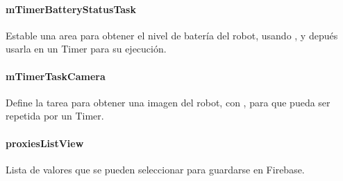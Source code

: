 \paragraph{mTimerBatteryStatusTask}
\label{\detokenize{dev_docs:mtimerbatterystatustask}}

\begin{fulllineitems}
\label{\detokenize{dev_docs:com.lar.cloudnao.RemoteControllerActivity.mTimerBatteryStatusTask}}
Estable una area para obtener el nivel de batería del robot, usando , y depués usarla en un Timer para su ejecución.

\end{fulllineitems}



\paragraph{mTimerTaskCamera}
\label{\detokenize{dev_docs:mtimertaskcamera}}

\begin{fulllineitems}
\label{\detokenize{dev_docs:com.lar.cloudnao.RemoteControllerActivity.mTimerTaskCamera}}
Define la tarea para obtener una imagen del robot, con , para que pueda ser repetida por un Timer.

\end{fulllineitems}



\paragraph{proxiesListView}
\label{\detokenize{dev_docs:proxieslistview}}

\begin{fulllineitems}
\label{\detokenize{dev_docs:com.lar.cloudnao.RemoteControllerActivity.proxiesListView}}
Lista de valores que se pueden seleccionar para guardarse en Firebase.

\end{fulllineitems}



